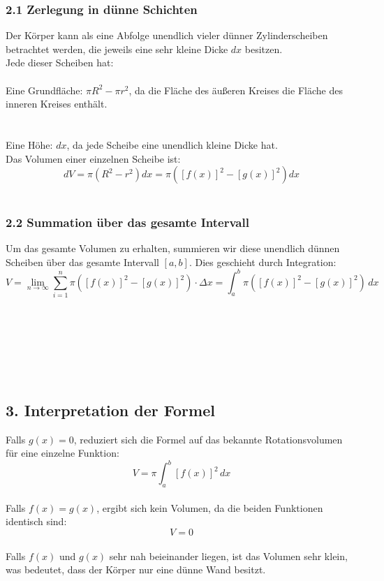 \documentclass[a4paper,final]{report}
\begin{document}
\subsubsection{2.1 Zerlegung in dünne Schichten}
Der Körper kann als eine Abfolge unendlich vieler dünner Zylinderscheiben betrachtet werden, die jeweils eine sehr kleine Dicke \( dx \) besitzen.
\\
Jede dieser Scheiben hat:\\
\\
Eine Grundfläche: \( \pi R^2 - \pi r^2 \), da die Fläche des äußeren Kreises die Fläche des inneren Kreises enthält.
\\
\\
\\Eine Höhe: \( dx \), da jede Scheibe eine unendlich kleine Dicke hat.
\\
Das Volumen einer einzelnen Scheibe ist:
\\
\[
dV = \pi (R^2 - r^2) dx = \pi \left( [f(x)]^2 - [g(x)]^2 \right) dx
\]
\\
\subsubsection{2.2 Summation über das gesamte Intervall}
Um das gesamte Volumen zu erhalten, summieren wir diese unendlich dünnen Scheiben über das gesamte Intervall \( [a,b] \). Dies geschieht durch Integration:
\\
\[
V = \lim_{n \to \infty} \sum_{i=1}^{n} \pi ([f(x)]^2 - [g(x)]^2) \cdot \Delta x = \int_a^b \pi \left( [f(x)]^2 - [g(x)]^2 \right) \, dx
\]
\\
\\
\\
\\
\\
\\
\subsection{3. Interpretation der Formel}
Falls \( g(x) = 0 \), reduziert sich die Formel auf das bekannte Rotationsvolumen für eine einzelne Funktion:
\\
  \[
  V = \pi \int_a^b [f(x)]^2 \, dx
  \]
\\
Falls \( f(x) = g(x) \), ergibt sich kein Volumen, da die beiden Funktionen identisch sind:
\\
  \[
  V = 0
  \]
\\
Falls \( f(x) \) und \( g(x) \) sehr nah beieinander liegen, ist das Volumen sehr klein, was bedeutet, dass der Körper nur eine dünne Wand besitzt.
\\
\cite{studysmarter_rotationskoerper}
\cite{lambacher_schweizer}
\end{document}
